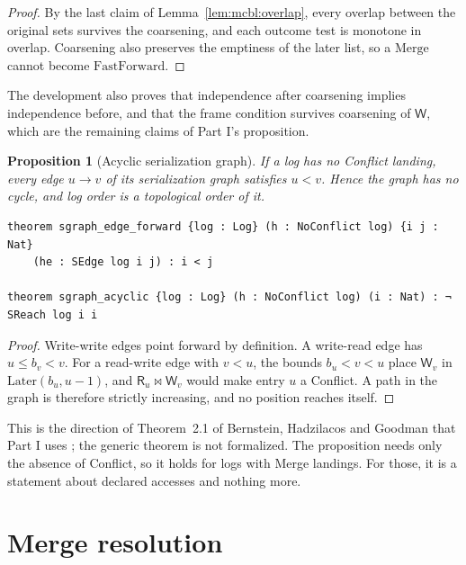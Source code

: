 \documentclass[11pt,letterpaper]{article}
\newtheorem{proposition}[theorem]{Proposition}
\theoremstyle{definition}
\theoremstyle{remark}
\newcommand{\R}{\mathsf{R}}
\newcommand{\W}{\mathsf{W}}
\newcommand{\meets}{\bowtie}
\newcommand{\Later}{\mathrm{Later}}
\newcommand{\FF}{\mathrm{FastForward}}
\newcommand{\Mg}{\mathrm{Merge}}
\begin{document}
\begin{proof}
By the last claim of Lemma~\ref{lem:mcbl:overlap}, every overlap between the original sets survives the coarsening, and each outcome test is monotone in overlap. Coarsening also preserves the emptiness of the later list, so a $\Mg$ cannot become $\FF$.
\end{proof}

The development also proves that independence after coarsening implies independence before, and that the frame condition survives coarsening of $\W$, which are the remaining claims of Part I's proposition.

\begin{proposition}[Acyclic serialization graph]
\label{prop:mcbl:acyclic}
If a log has no Conflict landing, every edge $u\to v$ of its serialization graph satisfies $u<v$. Hence the graph has no cycle, and log order is a topological order of it.
\end{proposition}

\begin{lstlisting}[language=Lean,caption={Acyclicity of the serialization graph (\texttt{YonedaTx/Graph.lean})},label={lst:mcbl:acyclic}]
theorem sgraph_edge_forward {log : Log} (h : NoConflict log) {i j : Nat}
    (he : SEdge log i j) : i < j

theorem sgraph_acyclic {log : Log} (h : NoConflict log) (i : Nat) : ¬ SReach log i i
\end{lstlisting}

\begin{proof}
Write-write edges point forward by definition. A write-read edge has $u\leq b_v<v$. For a read-write edge with $v<u$, the bounds $b_u<v<u$ place $\W_v$ in $\Later(b_u,u-1)$, and $\R_u\meets\W_v$ would make entry $u$ a Conflict. A path in the graph is therefore strictly increasing, and no position reaches itself.
\end{proof}

This is the direction of Theorem~2.1 of Bernstein, Hadzilacos and Goodman that Part I uses \cite{bhg1987}; the generic theorem is not formalized. The proposition needs only the absence of Conflict, so it holds for logs with Merge landings. For those, it is a statement about declared accesses and nothing more.

\section{Merge resolution}
\label{sec:mcbl:merge}
\end{document}
